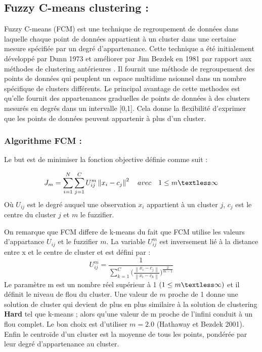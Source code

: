 \subsection{Fuzzy C-means clustering :}
Fuzzy C-means (FCM) est une technique de regroupement de données dans laquelle chaque point de données appartient à un cluster dans une certaine mesure spécifiée par un degré d'appartenance. Cette technique a été initialement développé par Dunn 1973 et améliorer par Jim Bezdek en 1981 par rapport aux méthodes de clustering antérieures \cite{taherpour2018application}. Il fournit une méthode de regroupement des points de données qui peuplent un espace multidime nsionnel dans un nombre spécifique de clusters différents. Le principal avantage de cette methodes est qu’elle fournit des appartenances graduelles de points de données à des clusters mesurés en degrés dans un intervalle [0,1]. Cela donne la flexibilité d'exprimer que les points de données peuvent appartenir à plus d'un cluster.
\subsubsection{Algorithme FCM :}
Le but est de minimiser la fonction objective définie comme suit :

\begin{equation}
    J_{m} = \sum_{i=1}^{N} \sum_{j=1}^{C} U_{ij}^{m} \left\lVert x_{i} - c_{j} \right\rVert^{2} \hspace{10pt} avec \hspace{10pt}  1 \leq m \textless \infty
\end{equation}
Où \(\displaystyle U_{ij} \) est le degré auquel une observation \(\displaystyle x_{i} \) appartient à un cluster \(\displaystyle j \), \(\displaystyle c_{j} \) est le centre du cluster \(\displaystyle j \) et \(\displaystyle m \) le fuzzifier.

On remarque que FCM differe de k-means  du fait que FCM utilise les valeurs d’appartance \(\displaystyle U_{ij} \) et le fuzzifier \(\displaystyle m \). La variable \(\displaystyle U_{ij}^{m} \) est inversement lié à la distance entre x et le centre de cluster et est défini par  :
\begin{equation}
    U_{ij}^{m} = \frac{1}{\sum_{k=1}^{C} \Bigg ( \frac{\left\lVert x_{i} - c_{j} \right\rVert }{\left\lVert x_{i} - c_{k} \right\rVert} \Bigg )^{\frac{2}{m-1}}}
\end{equation}
Le paramètre m est un nombre réel supérieur à 1 \(\displaystyle (1 \leq m \textless \infty) \) et il définit le niveau de flou du cluster. Une valeur de \(\displaystyle m \) proche de 1 donne une solution de cluster qui devient de plus en plus similaire à la solution de clustering \textbf{Hard} tel que k-means ; alors qu’une valeur de m proche de l’infini conduit à un flou complet. Le bon choix est d’utiliser \(\displaystyle m = 2.0 \)  (Hathaway et Bezdek 2001). \\
Enfin le centroïde d’un cluster est la moyenne de tous les points, pondérée par leur degré d’appartenance au cluster. 

